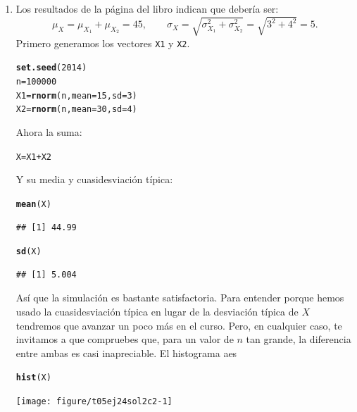 \documentclass[10pt,a4paper]{article}\usepackage[]{graphicx}\usepackage[]{color}
\makeatletter
\newcommand{\hlnum}[1]{\textcolor[rgb]{0.686,0.059,0.569}{#1}}%
\newcommand{\hlopt}[1]{\textcolor[rgb]{0,0,0}{#1}}%
\newcommand{\hlstd}[1]{\textcolor[rgb]{0.345,0.345,0.345}{#1}}%
\newcommand{\hlkwb}[1]{\textcolor[rgb]{0.69,0.353,0.396}{#1}}%
\newcommand{\hlkwc}[1]{\textcolor[rgb]{0.333,0.667,0.333}{#1}}%
\newcommand{\hlkwd}[1]{\textcolor[rgb]{0.737,0.353,0.396}{\textbf{#1}}}%
\newenvironment{kframe}{%
 \def\at@end@of@kframe{}%
 \ifinner\ifhmode%
  \def\at@end@of@kframe{\end{minipage}}%
  \begin{minipage}{\columnwidth}%
 \fi\fi%
 \def\FrameCommand##1{\hskip\@totalleftmargin \hskip-\fboxsep
 \colorbox{shadecolor}{##1}\hskip-\fboxsep
     \hskip-\linewidth \hskip-\@totalleftmargin \hskip\columnwidth}%
 \MakeFramed {\advance\hsize-\width
   \@totalleftmargin\z@ \linewidth\hsize
   \@setminipage}}%
 {\par\unskip\endMakeFramed%
 \at@end@of@kframe}
\newenvironment{knitrout}{}{} %
\makeatother
\begin{document}
\begin{enumerate}
  \item Los resultados de la página \pageref{curso-cap05:subsubsec:SumaVariablesAleatoriasNormales} del libro indican que debería ser:
        \[\mu_X = \mu_{X_1} +  \mu_{X_2} = 45,\qquad \sigma_X = \sqrt{\sigma_{X_1}^2+\sigma_{X_2}^2}=\sqrt{3^2 + 4^2}=5.\]
      Primero generamos los vectores {\tt X1} y {\tt X2}.
\begin{knitrout}
\color{fgcolor}\begin{kframe}
\begin{alltt}
  \hlkwd{set.seed}\hlstd{(}\hlnum{2014}\hlstd{)}
  \hlstd{n} \hlkwb{=} \hlnum{100000}
  \hlstd{X1} \hlkwb{=} \hlkwd{rnorm}\hlstd{(n,} \hlkwc{mean}\hlstd{=}\hlnum{15}\hlstd{,} \hlkwc{sd}\hlstd{=}\hlnum{3}\hlstd{)}
  \hlstd{X2} \hlkwb{=} \hlkwd{rnorm}\hlstd{(n,} \hlkwc{mean}\hlstd{=}\hlnum{30}\hlstd{,} \hlkwc{sd}\hlstd{=}\hlnum{4}\hlstd{)}
\end{alltt}
\end{kframe}
\end{knitrout}
        Ahora la suma:
\begin{knitrout}
\color{fgcolor}\begin{kframe}
\begin{alltt}
  \hlstd{X} \hlkwb{=} \hlstd{X1} \hlopt{+} \hlstd{X2}
\end{alltt}
\end{kframe}
\end{knitrout}
        Y su media y cuasidesviación típica:
\begin{knitrout}
\color{fgcolor}\begin{kframe}
\begin{alltt}
  \hlkwd{mean}\hlstd{(X)}
\end{alltt}
\begin{verbatim}
## [1] 44.99
\end{verbatim}
\begin{alltt}
  \hlkwd{sd}\hlstd{(X)}
\end{alltt}
\begin{verbatim}
## [1] 5.004
\end{verbatim}
\end{kframe}
\end{knitrout}
        Así que la simulación es bastante satisfactoria. Para entender porque hemos usado la cuasidesviación típica en lugar de la desviación típica de $X$ tendremos que avanzar un poco más en el curso. Pero, en cualquier caso, te invitamos a que compruebes que, para un valor de $n$ tan grande, la diferencia entre ambas es casi inapreciable. El histograma aes
\begin{knitrout}
\color{fgcolor}\begin{kframe}
\begin{alltt}
\hlkwd{hist}\hlstd{(X)}
\end{alltt}
\end{kframe}
\texttt{[image: figure/t05ej24sol2c2-1]} 


\end{knitrout}
\end{enumerate}
\end{document}
